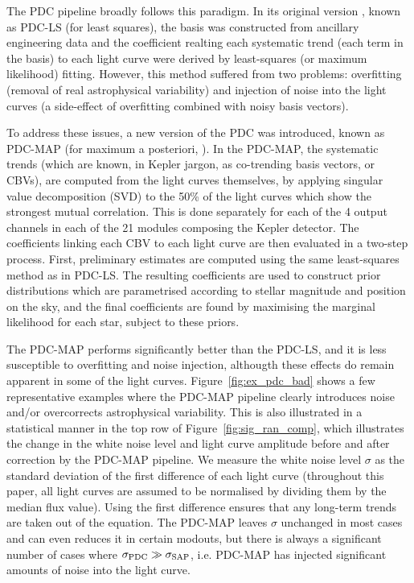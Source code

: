 \documentclass[useAMS,usenatbib]{mn2e}
\begin{document}
The PDC pipeline broadly follows this paradigm. In its original
version \citep{twi+10a,twi+10b}, known as PDC-LS (for least squares),
the basis was constructed from ancillary engineering data and the
coefficient realting each systematic trend (each term in the basis) to
each light curve were derived by least-squares (or maximum likelihood)
fitting. However, this method suffered from two problems: overfitting
(removal of real astrophysical variability) and injection of noise
into the light curves (a side-effect of overfitting combined with
noisy basis vectors). 

To address these issues, a new version of the PDC was introduced,
known as PDC-MAP (for maximum a posteriori, \citealt{smi+12}). In the
PDC-MAP, the systematic trends (which are known, in Kepler jargon, as
co-trending basis vectors, or CBVs), are computed from the light curves
themselves, by applying singular value decomposition (SVD) to the 50\%
of the light curves which show the strongest mutual correlation. This
is done separately for each of the 4 output channels in each of the 21
modules composing the Kepler detector. The
coefficients linking each CBV to each light curve are then evaluated
in a two-step process. First, preliminary estimates are computed using
the same least-squares method as in PDC-LS. The resulting coefficients
are used to construct prior distributions which are parametrised
according to stellar magnitude and position on the sky, and the final
coefficients are found by maximising the marginal likelihood for each
star, subject to these priors.

The PDC-MAP performs significantly better than the PDC-LS, and it is
less susceptible to overfitting and noise injection, althougth these
effects do remain apparent in some of the light
curves. Figure~\ref{fig:ex_pdc_bad} shows a few representative
examples where the PDC-MAP pipeline clearly introduces noise and/or
overcorrects astrophysical variability.  This is also illustrated in a
statistical manner in the top row of Figure~\ref{fig:sig_ran_comp},
which illustrates the change in the white noise level and light curve
amplitude before and after correction by the PDC-MAP pipeline. We
measure the white noise level $\sigma$ as the standard deviation of
the first difference of each light curve (throughout this paper, all
light curves are assumed to be normalised by dividing them by the
median flux value). Using the first difference ensures that any
long-term trends are taken out of the equation. The PDC-MAP leaves
$\sigma$ unchanged in most cases and can even reduces it in certain
modouts, but there is always a significant number of cases where
$\sigma_{\rm PDC} \gg \sigma_{\rm SAP}$, i.e. PDC-MAP has injected
significant amounts of noise into the light curve. 
\end{document}
